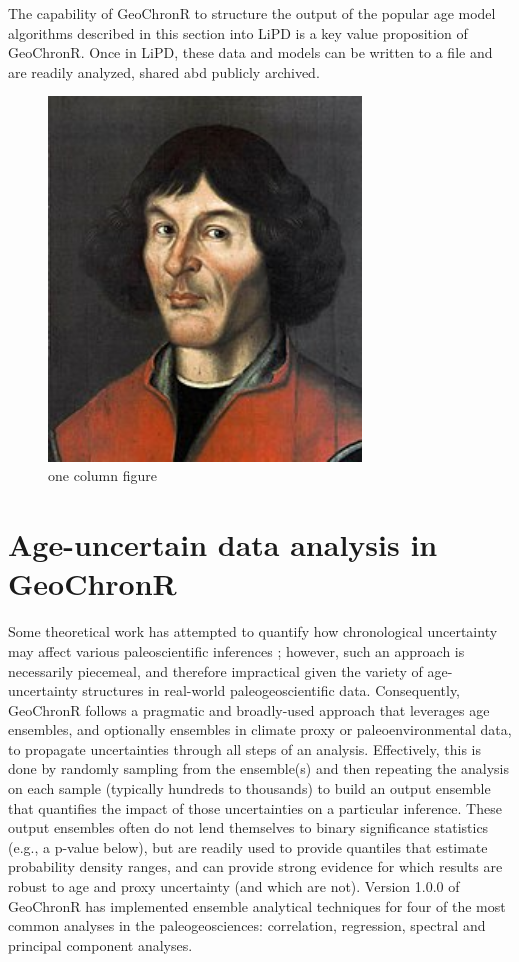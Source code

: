 \documentclass[gchron, manuscript]{copernicus}
\begin{document}
The capability of GeoChronR to structure the output of the popular age model algorithms described in this section into LiPD is a key value proposition of GeoChronR.
Once in LiPD, these data and models can be written to a file and are readily analyzed, shared abd publicly archived.

\begin{figure}
\includegraphics[width=8.3cm]{Nikolaus_Kopernikus} \caption{one column figure}\label{fig:lipd-chron}
\end{figure}

\hypertarget{sec:age-uncertain-analysis}{%
\section{Age-uncertain data analysis in GeoChronR}\label{sec:age-uncertain-analysis}}

Some theoretical work has attempted to quantify how chronological uncertainty may affect various paleoscientific inferences \citep[e.g.][]{HuybersWunsch2004}; however, such an approach is necessarily piecemeal, and therefore impractical given the variety of age-uncertainty structures in real-world paleogeoscientific data.
Consequently, GeoChronR follows a pragmatic and broadly-used approach that leverages age ensembles, and optionally ensembles in climate proxy or paleoenvironmental data, to propagate uncertainties through all steps of an analysis.
Effectively, this is done by randomly sampling from the ensemble(s) and then repeating the analysis on each sample (typically hundreds to thousands) to build an output ensemble that quantifies the impact of those uncertainties on a particular inference.
These output ensembles often do not lend themselves to binary significance statistics (e.g., a p-value below), but are readily used to provide quantiles that estimate probability density ranges, and can provide strong evidence for which results are robust to age and proxy uncertainty (and which are not).
Version 1.0.0 of GeoChronR has implemented ensemble analytical techniques for four of the most common analyses in the paleogeosciences: correlation, regression, spectral and principal component analyses.
\end{document}
